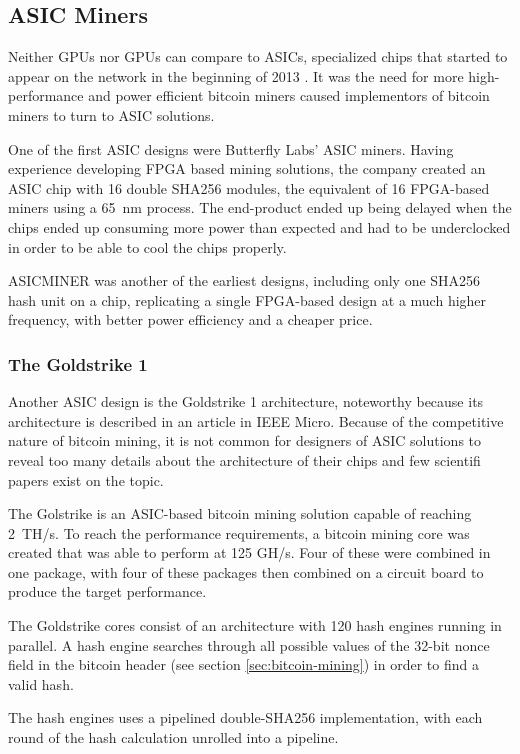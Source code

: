 \subsection{ASIC Miners}

Neither GPUs nor GPUs can compare to ASICs, specialized chips that started to appear on the network
in the beginning of 2013 \cite{first-asic-miner}. It was the need for more high-performance and power
efficient bitcoin miners caused implementors of bitcoin miners to turn to ASIC solutions.

One of the first ASIC designs were Butterfly Labs' ASIC miners. Having experience developing
FPGA based mining solutions, the company created an ASIC chip with 16 double SHA256 modules,
the equivalent of 16 FPGA-based miners using a 65~nm process. The end-product ended up being
delayed when the chips ended up consuming more power than expected and had to be underclocked
in order to be able to cool the chips properly.

ASICMINER was another of the earliest designs, including only one SHA256 hash unit on a chip,
replicating a single FPGA-based design at a much higher frequency, with better power efficiency
and a cheaper price. \cite{bespoke-silicon}

\subsubsection{The Goldstrike 1}
Another ASIC design is the Goldstrike 1 architecture, noteworthy because its architecture is
described in an article in IEEE Micro. Because of the competitive nature of bitcoin mining,
it is not common for designers of ASIC solutions to reveal too many details about the architecture
of their chips and few scientifi papers exist on the topic.

The Golstrike is an ASIC-based bitcoin mining solution capable of reaching 2~TH/s. To reach the performance
requirements, a bitcoin mining core was created that was able to perform at 125 GH/s. Four of
these were combined in one package, with four of these packages then combined on a circuit board
to produce the target performance.

The Goldstrike cores consist of an architecture with 120 hash engines running in parallel.
A hash engine searches through all possible values of the 32-bit nonce field in the bitcoin header
(see section \ref{sec:bitcoin-mining}) in order to find a valid hash.

The hash engines uses a pipelined double-SHA256 implementation, with each round of the hash calculation
unrolled into a pipeline.

